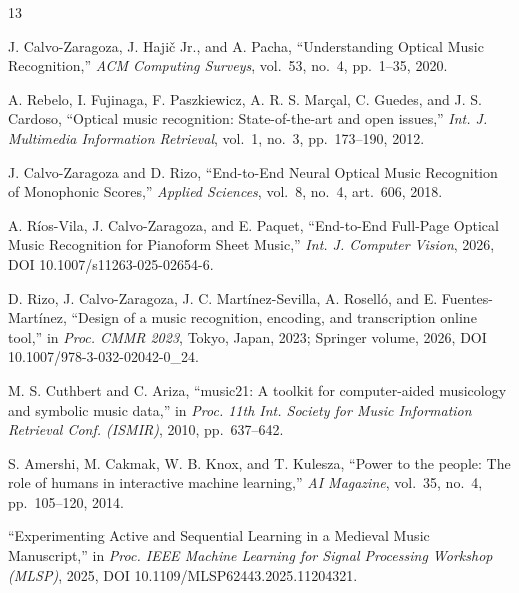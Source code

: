 \begin{thebibliography}{13}

J. Calvo-Zaragoza, J. Haji\v{c} Jr., and A. Pacha, ``Understanding Optical
Music Recognition,'' \emph{ACM Computing Surveys}, vol.~53, no.~4, pp.~1--35,
2020. %

A. Rebelo, I. Fujinaga, F. Paszkiewicz, A. R. S. Mar\c{c}al, C. Guedes, and
J. S. Cardoso, ``Optical music recognition: State-of-the-art and open
issues,'' \emph{Int. J. Multimedia Information Retrieval}, vol.~1, no.~3,
pp.~173--190, 2012. %

J. Calvo-Zaragoza and D. Rizo, ``End-to-End Neural Optical Music
Recognition of Monophonic Scores,'' \emph{Applied Sciences}, vol.~8, no.~4,
art.~606, 2018. %

A. R\'ios-Vila, J. Calvo-Zaragoza, and E. Paquet, ``End-to-End Full-Page
Optical Music Recognition for Pianoform Sheet Music,'' \emph{Int. J.
Computer Vision}, 2026, DOI 10.1007/s11263-025-02654-6. %

D. Rizo, J. Calvo-Zaragoza, J. C. Mart\'inez-Sevilla, A. Rosell\'o, and
E. Fuentes-Mart\'inez, ``Design of a music recognition, encoding, and
transcription online tool,'' in \emph{Proc. CMMR 2023}, Tokyo, Japan, 2023;
Springer volume, 2026, DOI 10.1007/978-3-032-02042-0_24. %

M. S. Cuthbert and C. Ariza, ``music21: A toolkit for computer-aided
musicology and symbolic music data,'' in \emph{Proc. 11th Int. Society for
Music Information Retrieval Conf. (ISMIR)}, 2010, pp.~637--642. %

S. Amershi, M. Cakmak, W. B. Knox, and T. Kulesza, ``Power to the people:
The role of humans in interactive machine learning,'' \emph{AI Magazine},
vol.~35, no.~4, pp.~105--120, 2014. %

``Experimenting Active and Sequential Learning in a Medieval Music
Manuscript,'' in \emph{Proc. IEEE Machine Learning for Signal Processing
Workshop (MLSP)}, 2025, DOI 10.1109/MLSP62443.2025.11204321. %


\end{thebibliography}
